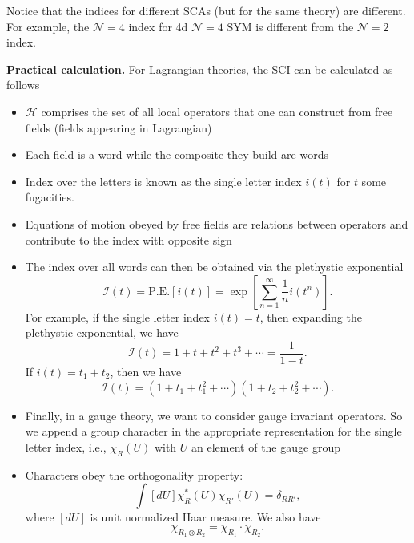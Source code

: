 \documentclass[a4paper,11pt]{article}
\begin{document}
Notice that the indices for different SCAs (but for the same theory) are different. For example, the $\mathcal{N}=4$ index for 4d $\mathcal{N}=4$ SYM is different from the $\mathcal{N}=2$ index.

\bigskip
\noindent\textbf{Practical calculation.}
For Lagrangian theories, the SCI can be calculated as follows
\begin{itemize}
    \item $\mathcal{H}$ comprises the set of all local operators that one can construct from free fields (fields appearing in Lagrangian)
    \item Each field is a word while the composite they build are words
    \item Index over the letters is known as  the single letter index $i(t)$ for $t$ some fugacities.
    \item Equations of motion obeyed by free fields are relations between operators and contribute to the index with opposite sign
    \item The index over all words can then be obtained via the plethystic exponential
    \begin{equation}
        \mathcal{I}(t) = \mathrm{P.E.}[i(t)] = \exp\left[\sum_{n=1}^\infty \frac{1}{n}i(t^n)\right].
    \end{equation}
    For example, if the single letter index $i(t) = t$, then expanding the plethystic exponential, we have
    \begin{equation}
        \mathcal{I}(t) = 1 + t + t^2 + t^3 + \cdots = \frac{1}{1-t}.
    \end{equation}
    If $i(t) = t_1 + t_2$, then we have
    \begin{equation}
        \mathcal{I}(t) = (1 + t_1 + t_1^2 + \cdots) (1+t_2 + t_2^2 + \cdots).
    \end{equation}
    \item Finally, in a gauge theory, we want to consider gauge invariant operators. So we append a group character in the appropriate representation for the single letter index, i.e., $\chi_R(U)$ with $U$ an element of the gauge group  
    \item Characters obey the orthogonality property:
    \begin{equation}
        \int[dU] \chi_R^*(U) \chi_{R'}(U) = \delta_{RR'},
    \end{equation}
    where $[dU]$ is unit normalized Haar measure. We also have
    \begin{equation}
        \chi_{R_1 \otimes R_2} = \chi_{R_1} \cdot \chi_{R_2}.

\end{equation}
\end{itemize}
\end{document}

